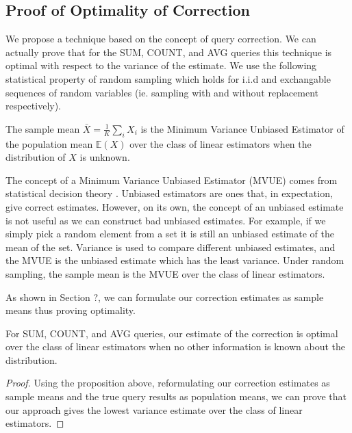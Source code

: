 \subsection{Proof of Optimality of Correction}
We propose a technique based on the concept of query correction.
We can actually prove that for the SUM, COUNT, and AVG queries this technique is optimal with respect to the variance of the estimate.
We use the following statistical property of random sampling which holds for i.i.d and exchangable sequences of random variables (ie. sampling with and without replacement respectively).
\begin{proposition}
The sample mean $\bar{X} = \frac{1}{K}\sum_i X_i$ is the Minimum Variance Unbiased Estimator of the population mean $\mathbb{E}(X)$ over the class of linear estimators when the distribution of $X$ is unknown.
\end{proposition}
The concept of a Minimum Variance Unbiased Estimator (MVUE) comes from statistical decision theory \cite{cox1979theoretical}.
Unbiased estimators are ones that, in expectation, give correct estimates.
However, on its own, the concept of an unbiased estimate is not useful as we can construct bad unbiased estimates.
For example, if we simply pick a random element from a set it is still an unbiased estimate of the mean of the set.
Variance is used to compare different unbiased estimates, and the MVUE is the unbiased estimate which has the least variance.
Under random sampling, the sample mean is the MVUE over the class of linear estimators.

As shown in Section ?, we can formulate our correction estimates as sample means thus proving optimality. 
\begin{theorem}
For SUM, COUNT, and AVG queries, our estimate of the correction is optimal over the class of linear estimators when no other information is known about the distribution. 
\end{theorem}
\begin{proof}
Using the proposition above, reformulating our correction estimates as sample means and the true query results as population means, we can prove that our approach gives the lowest variance estimate over the class of linear estimators.
\end{proof}

